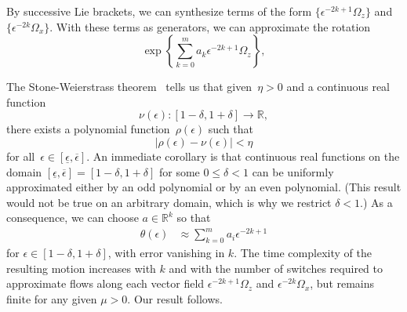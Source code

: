 \documentclass[letter paper, 10pt, conference]{ieeeconf}
\providecommand{\abs}[1]{\lvert#1\rvert}
\providecommand{\norm}[1]{\lVert#1\rVert}
\providecommand{\field}[1]{\mathbb{#1}}
\providecommand{\R}{\field{R}}
\begin{document}
By successive Lie brackets, we can synthesize terms of the form $\{\epsilon^{-2k+1}\Omega_z\}$ and $\{\epsilon^{-2k}\Omega_x\}$.  With these terms as generators, we can approximate the rotation
\[\exp\left\{\sum_{k=0}^m  a_k \epsilon^{-2k+1}\Omega_z \right\},\]   

The Stone-Weierstrass theorem~\cite{Royden1988} tells us that given~$\eta > 0$ and a continuous real function
\[
\nu(\epsilon) \colon [1-\delta,1+\delta] \to \R,
\]
there exists a polynomial function~$\rho(\epsilon)$ such that
\[
\abs{\rho(\epsilon) - \nu(\epsilon)} < \eta
\]
for all~$\epsilon \in [\underline{\epsilon},\overline{\epsilon}]$.
An immediate corollary is that
continuous real functions
on the domain $[\underline{\epsilon},\overline{\epsilon}]=[1-\delta,1+\delta]$ for some ${0\leq\delta<1}$ can be uniformly approximated either by an odd polynomial or by an even polynomial. (This result would not be true on an arbitrary domain, which is why we restrict ${\delta<1}$.) As a consequence,
we can choose $a\in\R^{k}$ so that
\begin{align*}
\theta(\epsilon) &\approx \sum_{k=0}^{m} a_{i}\epsilon^{-2k+1} 
\end{align*}
for $\epsilon\in[1-\delta,1+\delta]$, with error vanishing in $k$.
The time complexity of the resulting motion increases with $k$ and with the number of switches required to approximate flows along each
vector field  $\epsilon^{-2k+1}\Omega_{z}$ and $\epsilon^{-2k}\Omega_{x}$, but remains finite for any given $\mu>0$.
Our result follows.
 \endproof
\end{document}
